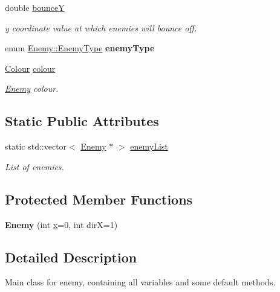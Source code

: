 \begin{DoxyCompactItemize}
double \hyperlink{class_enemy_a0be1b3814551bf2d43cbcd00a2c8134e}{bounceY}
\begin{DoxyCompactList}\small\item\em y coordinate value at which enemies will bounce off. \end{DoxyCompactList}\item 
\mbox{\label{class_enemy_aebb86651c5be3c4e359a15b2832e5e4a}} 
enum \hyperlink{class_enemy_a98c2ee2c2081001de17a4bc9fa8da94f}{Enemy\+::\+Enemy\+Type} {\bfseries enemy\+Type}
\item 
\hyperlink{struct_colour}{Colour} \hyperlink{class_enemy_a8fcd6954051e37e2ee89104e57145112}{colour}
\begin{DoxyCompactList}\small\item\em \hyperlink{class_enemy}{Enemy} colour. \end{DoxyCompactList}\end{DoxyCompactItemize}
\subsection*{Static Public Attributes}
\begin{DoxyCompactItemize}
\item 
\mbox{\label{class_enemy_ad21b742c9768be0162f53d1beb212830}} 
static std\+::vector$<$ \hyperlink{class_enemy}{Enemy} $\ast$ $>$ \hyperlink{class_enemy_ad21b742c9768be0162f53d1beb212830}{enemy\+List}
\begin{DoxyCompactList}\small\item\em List of enemies. \end{DoxyCompactList}\end{DoxyCompactItemize}
\subsection*{Protected Member Functions}
\begin{DoxyCompactItemize}
\item 
\mbox{\label{class_enemy_a6124e0876e6ffd333ea69a246aecc993}} 
{\bfseries Enemy} (int \hyperlink{class_enemy_a05e9e91e87d6eae0da31cc6d78a0b43d}{x}=0, int dirX=1)
\end{DoxyCompactItemize}


\subsection{Detailed Description}
Main class for enemy, containing all variables and some default methods. 

